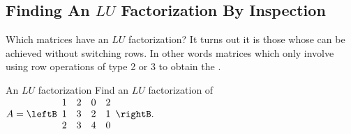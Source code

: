 \subsection{Finding An $LU$ Factorization By Inspection}

Which matrices have an $LU$ factorization? It turns out it is those whose
\ef\; can be achieved without switching rows. In other words matrices which
only involve using row operations of type 2 or 3 to obtain the \ef.

\begin{example}{An $LU$ factorization}
Find an $LU$ factorization of $A=\leftB
\begin{array}{cccc}
1 & 2 & 0 & 2 \\
1 & 3 & 2 & 1 \\
2 & 3 & 4 & 0%
\end{array}
\rightB .$
\end{example}

